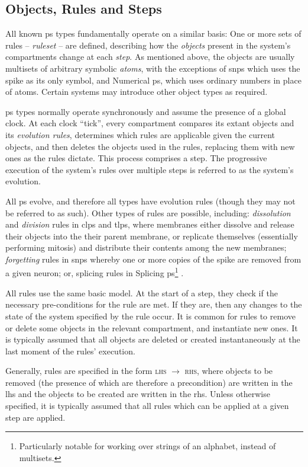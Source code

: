 \subsection{Objects, Rules and Steps}
All known \gls{ps} types fundamentally operate on a similar basis:  One or more sets of rules -- \emph{\gls{ruleset}} -- are defined, describing how the \emph{objects} present in the system's \glspl{compartment} change at each \emph{step}.  As mentioned above, the objects are usually multisets of arbitrary symbolic \emph{atoms}, with the exceptions of \gls{snps} which uses the spike as its only symbol, and Numerical \gls{ps}, which uses ordinary numbers in place of atoms.  Certain systems may introduce other object types as required.

\Gls{ps} types normally operate synchronously and assume the presence of a global clock.  At each clock ``tick'', every \gls{compartment} compares its extant objects and its \emph{evolution rules}, determines which rules are applicable given the current objects, and then deletes the objects used in the rules, replacing them with new ones as the rules dictate.  This process comprises a step.  The progressive execution of the system's rules over multiple steps is referred to as the system's evolution.

All \gls{ps} evolve, and therefore all types have evolution rules (though they may not be referred to as such).  Other types of rules are possible, including: \emph{dissolution} and \emph{division} rules in \gls{clps} and \gls{tlps}, where membranes either dissolve and release their objects into the their parent membrane, or replicate themselves (essentially performing mitosis) and distribute their contents among the new membranes; \emph{forgetting} rules in \gls{snps} whereby one or more copies of the spike are removed from a given neuron; or, splicing rules in Splicing \Gls{ps}\footnote{Particularly notable for working over strings of an alphabet, instead of multisets.} \cite[Ch.~8]{Paun2010b}.

All rules use the same basic model.  At the start of a step, they check if the necessary pre-conditions for the rule are met.  If they are, then any changes to the state of the system specified by the rule occur.  It is common for rules to remove or delete some objects in the relevant \gls{compartment}, and instantiate new ones.  It is typically assumed that all objects are deleted or created instantaneously at the last moment of the rules' execution.

Generally, rules are specified in the form \textsc{\gls{lhs}} \(\rightarrow\) \textsc{\gls{rhs}}, where objects to be removed (the presence of which are therefore a precondition) are written in the \gls{lhs} and the objects to be created are written in the \gls{rhs}.  Unless otherwise specified, it is typically assumed that all rules which can be applied at a given step are applied.

